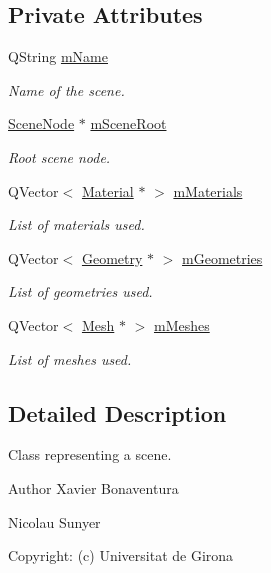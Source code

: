 \subsection*{Private Attributes}
\begin{DoxyCompactItemize}
\item 
Q\+String \hyperlink{class_scene_acfce52e7dbef4c558420dcff71ebaea2}{m\+Name}
\begin{DoxyCompactList}\small\item\em Name of the scene. \end{DoxyCompactList}\item 
\hyperlink{class_scene_node}{Scene\+Node} $\ast$ \hyperlink{class_scene_a3852bae07cc9951aba145324ca8ff660}{m\+Scene\+Root}
\begin{DoxyCompactList}\small\item\em Root scene node. \end{DoxyCompactList}\item 
Q\+Vector$<$ \hyperlink{class_material}{Material} $\ast$ $>$ \hyperlink{class_scene_a30c33e5924edf69d4509c25945e6176e}{m\+Materials}
\begin{DoxyCompactList}\small\item\em List of materials used. \end{DoxyCompactList}\item 
Q\+Vector$<$ \hyperlink{class_geometry}{Geometry} $\ast$ $>$ \hyperlink{class_scene_a4113c0d9e9d7b98c7b883b2daa0fdd0a}{m\+Geometries}
\begin{DoxyCompactList}\small\item\em List of geometries used. \end{DoxyCompactList}\item 
Q\+Vector$<$ \hyperlink{class_mesh}{Mesh} $\ast$ $>$ \hyperlink{class_scene_a9f78af49e4984a661cda648e6c211e0c}{m\+Meshes}
\begin{DoxyCompactList}\small\item\em List of meshes used. \end{DoxyCompactList}\end{DoxyCompactItemize}


\subsection{Detailed Description}
Class representing a scene. 

\begin{DoxyAuthor}{Author}
Xavier Bonaventura 

Nicolau Sunyer 

Copyright\+: (c) Universitat de Girona 
\end{DoxyAuthor}



